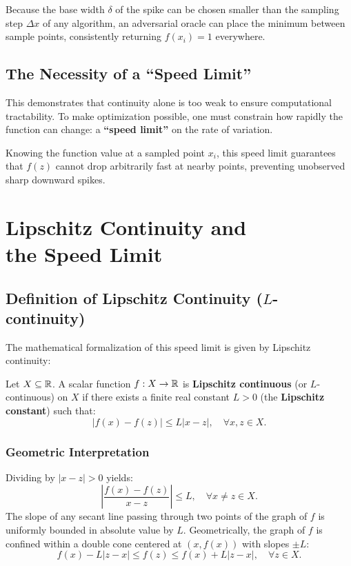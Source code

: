 Because the base width $\delta$ of the spike can be chosen smaller than the sampling step $\Delta x$ of any algorithm, an adversarial oracle can place the minimum between sample points, consistently returning $f(x_i) = 1$ everywhere.

\subsection{The Necessity of a ``Speed Limit''}
This demonstrates that continuity alone is too weak to ensure computational tractability. To make optimization possible, one must constrain how rapidly the function can change: a \textbf{``speed limit''} on the rate of variation.

Knowing the function value at a sampled point $x_i$, this speed limit guarantees that $f(z)$ cannot drop arbitrarily fast at nearby points, preventing unobserved sharp downward spikes.

\FloatBarrier
\section[Lipschitz Continuity and the Speed Limit]{Lipschitz Continuity and\\the Speed Limit}
\label{sec:univariate-lipschitz-speed-limit-en}

\subsection{Definition of Lipschitz Continuity ($L$-continuity)}
The mathematical formalization of this speed limit is given by Lipschitz continuity:

\begin{definition}
\label{def:lipschitz-univariate-en}
Let $X \subseteq \mathbb{R}$. A scalar function $f: X \to \mathbb{R}$ is \textbf{Lipschitz continuous} (or $L$-continuous) on $X$ if there exists a finite real constant $L > 0$ (the \textbf{Lipschitz constant}) such that:
\begin{equation}
    |f(x) - f(z)| \le L |x - z|, \quad \forall x, z \in X.
    \label{eq:lipschitz-def-en}
\end{equation}
\end{definition}

\subsubsection{Geometric Interpretation}
Dividing by $|x - z| > 0$ yields:
\begin{equation}
    \left| \frac{f(x) - f(z)}{x - z} \right| \le L, \quad \forall x \neq z \in X.
\end{equation}
The slope of any secant line passing through two points of the graph of $f$ is uniformly bounded in absolute value by $L$. Geometrically, the graph of $f$ is confined within a double cone centered at $(x, f(x))$ with slopes $\pm L$:
\begin{equation}
    f(x) - L|z - x| \le f(z) \le f(x) + L|z - x|, \quad \forall z \in X.
\end{equation}

